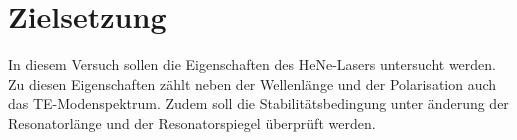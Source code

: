 \section{Zielsetzung}
In diesem Versuch sollen die Eigenschaften des HeNe-Lasers untersucht werden. Zu diesen Eigenschaften zählt
neben der Wellenlänge und der Polarisation auch das TE-Modenspektrum. Zudem soll die Stabilitätsbedingung 
unter änderung der Resonatorlänge und der Resonatorspiegel überprüft werden.
